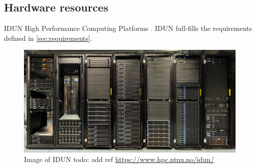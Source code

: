 \subsection{Hardware resources}
\label{sec:hardware-resources}

IDUN High Performance Computing Platforms \cite{epic}.
IDUN full-fills the requirements defined in \cref{sec:requirements}.
\begin{figure}[htp]
    \centering
    \includegraphics[width=\textwidth]{figures/idun.jpeg}
    \caption{Image of IDUN todo: add ref \url{https://www.hpc.ntnu.no/idun/}}
    \label{fig:flowchart}
\end{figure}
